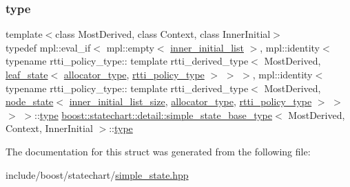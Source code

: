 \subsubsection{\texorpdfstring{type}{type}}
{\footnotesize\ttfamily template$<$class Most\+Derived, class Context, class Inner\+Initial$>$ \\
typedef mpl\+::eval\+\_\+if$<$ mpl\+::empty$<$ \mbox{\hyperlink{structboost_1_1statechart_1_1detail_1_1simple__state__base__type_aac74557aa49951c88f68f5b66470b679}{inner\+\_\+initial\+\_\+list}} $>$, mpl\+::identity$<$ typename rtti\+\_\+policy\+\_\+type\+:: template rtti\+\_\+derived\+\_\+type$<$ Most\+Derived, \mbox{\hyperlink{classboost_1_1statechart_1_1detail_1_1leaf__state}{leaf\+\_\+state}}$<$ \mbox{\hyperlink{structboost_1_1statechart_1_1detail_1_1simple__state__base__type_a435aafee614e28d33bab92dffc2e879b}{allocator\+\_\+type}}, \mbox{\hyperlink{structboost_1_1statechart_1_1detail_1_1simple__state__base__type_a6a41400b974abd80bbd4c10ed753745b}{rtti\+\_\+policy\+\_\+type}} $>$ $>$ $>$, mpl\+::identity$<$ typename rtti\+\_\+policy\+\_\+type\+:: template rtti\+\_\+derived\+\_\+type$<$ Most\+Derived, \mbox{\hyperlink{classboost_1_1statechart_1_1detail_1_1node__state}{node\+\_\+state}}$<$ \mbox{\hyperlink{structboost_1_1statechart_1_1detail_1_1simple__state__base__type_a575dd67321ac3022634df1f716a93131}{inner\+\_\+initial\+\_\+list\+\_\+size}}, \mbox{\hyperlink{structboost_1_1statechart_1_1detail_1_1simple__state__base__type_a435aafee614e28d33bab92dffc2e879b}{allocator\+\_\+type}}, \mbox{\hyperlink{structboost_1_1statechart_1_1detail_1_1simple__state__base__type_a6a41400b974abd80bbd4c10ed753745b}{rtti\+\_\+policy\+\_\+type}} $>$ $>$ $>$ $>$\+::\mbox{\hyperlink{structboost_1_1statechart_1_1detail_1_1simple__state__base__type_af90a0a8f976dd22839145952facf37b7}{type}} \mbox{\hyperlink{structboost_1_1statechart_1_1detail_1_1simple__state__base__type}{boost\+::statechart\+::detail\+::simple\+\_\+state\+\_\+base\+\_\+type}}$<$ Most\+Derived, Context, Inner\+Initial $>$\+::\mbox{\hyperlink{structboost_1_1statechart_1_1detail_1_1simple__state__base__type_af90a0a8f976dd22839145952facf37b7}{type}}}



The documentation for this struct was generated from the following file\+:\begin{DoxyCompactItemize}
\item 
include/boost/statechart/\mbox{\hyperlink{simple__state_8hpp}{simple\+\_\+state.\+hpp}}\end{DoxyCompactItemize}
